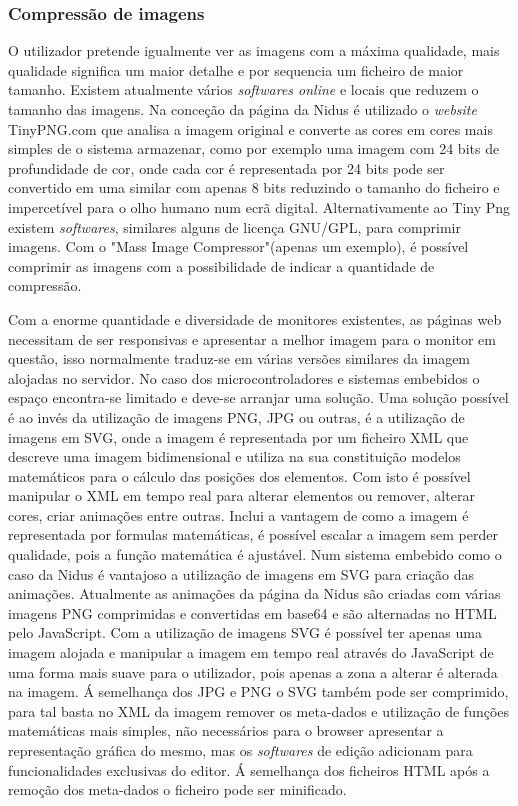 \subsubsection{Compressão de imagens}
\par

O utilizador pretende igualmente ver as imagens com a máxima qualidade, mais qualidade significa um maior detalhe e por sequencia um ficheiro de maior tamanho. Existem atualmente vários \textit{softwares online} e locais que reduzem o tamanho das imagens. Na conceção da página da Nidus é utilizado o \textit{website} TinyPNG.com que analisa a imagem original e converte as cores em cores mais simples de o sistema armazenar, como por exemplo uma imagem com 24 bits de profundidade de cor, onde cada cor é representada por 24 bits pode ser convertido em uma similar com apenas 8 bits reduzindo o tamanho do ficheiro e impercetível para o olho humano num ecrã digital\cite{Hilles2019}. Alternativamente ao Tiny Png existem \textit{softwares}, similares alguns de licença GNU/GPL, para comprimir imagens. Com o "Mass Image Compressor"\cite{Mass_Image_Compressor}(apenas um exemplo), é possível comprimir as imagens com a possibilidade de indicar a quantidade de compressão.
\par
Com a enorme quantidade e diversidade de monitores existentes, as páginas web necessitam de ser responsivas e apresentar a melhor imagem para o monitor em questão, isso normalmente traduz-se em várias versões similares da imagem alojadas no servidor. No caso dos microcontroladores e sistemas embebidos o espaço encontra-se limitado e deve-se arranjar uma solução. Uma solução possível é ao invés da utilização de imagens PNG, JPG ou outras, é a utilização de imagens em SVG, onde a imagem é representada por um ficheiro XML que descreve uma imagem bidimensional e utiliza na sua constituição modelos matemáticos para o cálculo das posições dos elementos. Com isto é possível manipular o XML em tempo real para alterar elementos ou remover, alterar cores, criar animações entre outras. Inclui a vantagem de como a imagem é representada por formulas matemáticas, é possível escalar a imagem sem perder qualidade, pois a função matemática é ajustável. Num sistema embebido como o caso da Nidus é vantajoso a utilização de imagens em SVG para criação das animações. Atualmente as animações da página da Nidus são criadas com várias imagens PNG comprimidas e convertidas em base64 e são alternadas no HTML pelo JavaScript. Com a utilização de imagens SVG é possível ter apenas uma imagem alojada e manipular a imagem em tempo real através do JavaScript de uma forma mais suave para o utilizador, pois apenas a zona a alterar é alterada na imagem.
Á semelhança dos JPG e PNG o SVG também pode ser comprimido, para tal basta no XML da imagem remover os meta-dados e utilização de funções matemáticas mais simples, não necessários para o browser apresentar a representação gráfica do mesmo, mas os \textit{softwares} de edição adicionam para funcionalidades exclusivas do editor. Á semelhança dos ficheiros HTML após a remoção dos meta-dados o ficheiro pode ser minificado.

